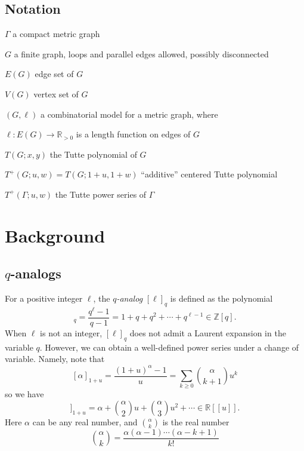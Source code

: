 \documentclass{amsart}
\theoremstyle{definition}
\newcommand{\RR}{\mathbb{R}}
\newcommand{\ZZ}{\mathbb{Z}}
\newcommand{\RRpos}{\RR_{>0}}
\newcommand{\fanalog}[2]{[\![#2]\!]_{#1}}
\begin{document}
\subsection{Notation}

$\Gamma$ a compact metric graph

$G$ a finite graph, 
loops and parallel edges allowed,
possibly disconnected

$E(G)$ edge set of $G$

$V(G)$ vertex set of $G$

$(G,\ell)$ a combinatorial model for a metric graph,
where 

$\ell : E(G) \to \RRpos$
is a length function on edges of $G$

$T(G; x,y)$ the Tutte polynomial of $G$

$T^+(G; u,w) = T(G; 1+u,1+w)$ ``additive'' centered Tutte polynomial

$T^+(\Gamma; u,w)$ the Tutte power series of $\Gamma$




\section{Background}

\subsection{$q$-analogs}
For a positive integer $\ell$,
the {\em $q$-analog}
$[\ell]_q$ is defined as
the polynomial
\begin{equation*}
[\ell]_q = \frac{q^\ell - 1}{q - 1}
= 1 + q + q^2 + \cdots + q^{\ell -1} 
\in \ZZ[q].
\end{equation*}
When $\ell$ is not an integer, 
$[\ell]_q$ does not admit a Laurent expansion in the variable $q$.
However, we can obtain a well-defined power series under a change of variable.
Namely, note that
\[ [\alpha]_{1+u} = \frac{(1+u)^\alpha - 1}{u}
= \sum_{k \geq 0} \binom{\alpha}{k+1}u^{k} 
\]
so we have 
\begin{equation}
\fanalog{1+u}{\alpha} = \alpha + \binom{\alpha}{2} u + \binom{\alpha}{3} u^2 + \cdots
\in \RR[[u]] .
\end{equation}
Here $\alpha$ can be any real number, and $\binom{\alpha}{k}$ is the real number
\begin{equation}
\binom{\alpha}{k} = \frac{\alpha (\alpha-1) \cdots (\alpha-k+1)}{k!} 
\end{equation}
\end{document}
